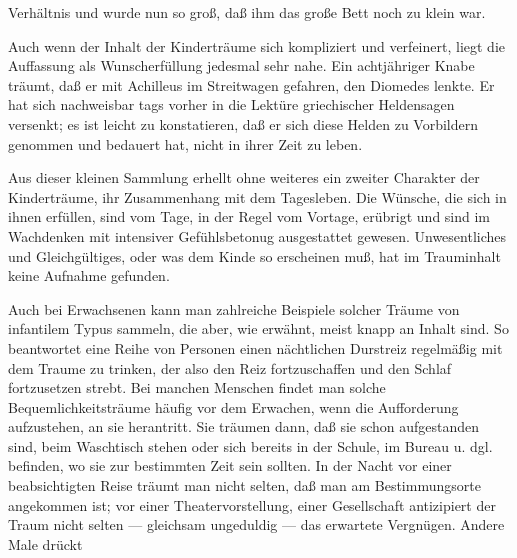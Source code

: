 \documentclass[twoside=true,titlepage=false,open=any, parskip=never, fontsize=10pt, headings=small, chapterprefix=false, appendixprefix=false]{scrbook}
\begin{document}
         
            
            
            
        \pstart
        Verhältnis und wurde nun so groß, daß ihm das große Bett noch zu
               klein war.
        \pend
    
            
        \pstart
        Auch wenn der Inhalt der Kinderträume sich kompliziert und verfeinert, liegt die
               Auffassung als Wunscherfüllung jedesmal sehr nahe. Ein achtjähriger Knabe
               träumt, daß er mit Achilleus im Streitwagen gefahren, den Diomedes lenkte. Er
               hat sich nachweisbar tags vorher in die Lektüre griechischer
               Heldensagen versenkt; es ist leicht zu konstatieren, daß er sich
               diese Helden zu Vorbildern genommen und bedauert hat, nicht in ihrer Zeit
               zu leben.
        \pend
    
            
        \pstart
        Aus dieser kleinen Sammlung erhellt ohne weiteres ein zweiter Charakter der
               Kinderträume, ihr Zusammenhang mit dem Tagesleben.
               Die Wünsche, die sich in ihnen erfüllen, sind vom Tage, in der Regel vom
               Vortage, erübrigt und sind im Wachdenken mit intensiver Gefühlsbetonug
               ausgestattet gewesen. Unwesentliches und Gleichgültiges, oder was dem Kinde
               so erscheinen muß, hat im Trauminhalt keine Aufnahme gefunden.
        \pend
    
            
        \pstart
        Auch bei Erwachsenen kann man zahlreiche Beispiele solcher Träume von infantilem
               Typus sammeln, die aber, wie erwähnt, meist knapp an Inhalt sind. So beantwortet
               eine Reihe von Personen einen nächtlichen Durstreiz regelmäßig mit
               dem Traume zu trinken, der also den Reiz fortzuschaffen und den Schlaf fortzusetzen strebt. Bei manchen Menschen findet man solche
               Bequemlichkeitsträume häufig vor dem Erwachen,
               wenn die Aufforderung aufzustehen, an sie herantritt. Sie träumen dann, daß
               sie schon aufgestanden sind, beim Waschtisch stehen oder sich bereits in der
               Schule, im Bureau u. dgl. befinden, wo sie zur bestimmten Zeit sein sollten. In
               der Nacht vor einer beabsichtigten Reise träumt man nicht selten, daß man
               am Bestimmungsorte angekommen ist; vor einer Theatervorstellung, einer
               Gesellschaft antizipiert der Traum nicht selten — gleichsam
               ungeduldig — das erwartete Vergnügen. Andere Male drückt
        \pend
    
\end{document}
